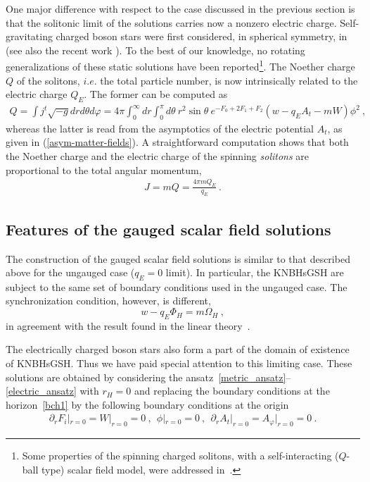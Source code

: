 One major difference with respect to the case 
discussed in the previous section 
 is that the solitonic limit of the solutions carries now a nonzero electric charge.
Self-gravitating charged boson stars were first considered, in spherical symmetry, in~\cite{Jetzer:1989av} 
(see also the recent work  \cite{Pugliese:2013gsa}). 
To the best of our knowledge, no rotating generalizations of these static solutions have been reported\footnote{ 
Some properties of the spinning charged solitons, 
with a self-interacting ($Q$-ball type) scalar field model, were addressed in~\cite{Brihaye:2009dx}.
}.
The Noether charge $Q$ of the solitons, $i.e.$ the total
particle number, is now intrinsically related to the electric charge $Q_E$. 
The former can be computed as  
%
\begin{eqnarray}
\label{Q1}
Q= \int j^t \sqrt{-g} dr  d\theta d\varphi=
 4\pi \int_{0}^\infty dr \int_0^\pi d\theta  
~r^2\sin \theta ~e^{-F_0+2F_1+F_2}  (w-q_E A_t -mW)\phi^2 \ ,
\end{eqnarray}
%
whereas the latter is read from the asymptotics
 of the electric potential $A_t$, as given in  (\ref{asym-matter-fields}). 
A straightforward computation 
shows that both the Noether charge and the electric charge of the spinning \textit{solitons}
are proportional  to the total angular momentum,
\begin{eqnarray}
\label{JQ}
J= m Q=\frac{4 \pi m Q_E}{q_E}\ .
\end{eqnarray} 


\subsection{Features of the gauged scalar field solutions}
\label{sec_results_g}
 
The construction of the  gauged scalar field solutions is similar 
to that described above for the ungauged case ($q_E=0$ limit).
In particular, the KNBHsGSH are subject to the same set of 
boundary conditions  used in the ungauged case.
The synchronization condition, however, is different,   
\begin{equation}
\label{cond-new}
 w-q_E \Phi_H=m \Omega_H \ ,
\end{equation}
in agreement with the result found in the linear theory~\cite{Hod:2014baa,Benone:2014ssa}.



The electrically charged boson stars also form a part of the domain of existence of KNBHsGSH. 
Thus we have paid special attention to this limiting case.
These solutions  are obtained by considering the ansatz~\eqref{metric_ansatz}--\eqref{electric_ansatz} with $r_H=0$ 
and replacing the boundary conditions at the horizon~\eqref{bch1} 
by the following boundary conditions at the origin
\begin{eqnarray}
\label{bc0} 
\partial_r F_i|_{r=0}= 
W|_{r=0}=0\ ,~~
\phi| _{r =0}=0\ ,~~\partial_r A_t|_{r=0}=A_\varphi|_{r=0}=0\ .
\end{eqnarray}
% 

